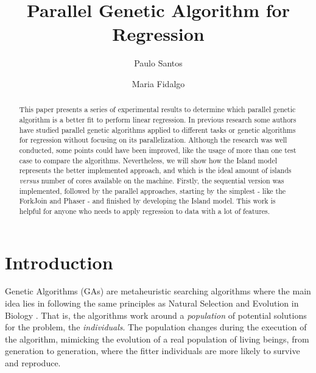 \documentclass[runningheads]{llncs}
\begin{document}
\title{Parallel Genetic Algorithm for Regression}

\author{Paulo Santos \and
Maria Fidalgo
}


\maketitle

\begin{abstract}
This paper presents a series of experimental results to determine which parallel genetic algorithm is a better fit to perform linear regression. In previous research some authors have studied parallel genetic algorithms applied to different tasks or genetic algorithms for regression without focusing on its parallelization. Although the research was well conducted, some points could have been improved, like the usage of more than one test case to compare the algorithms. Nevertheless, we will show how the Island model represents the better implemented approach, and which is the ideal amount of islands \textit{versus} number of cores available on the machine. Firstly, the sequential version was implemented, followed by the parallel approaches, starting by the simplest - like the ForkJoin and Phaser - and finished by developing the Island model. This work is helpful for anyone who needs to apply regression to data with a lot of features.

\end{abstract}


\section{Introduction}

Genetic Algorithms (GAs) are metaheuristic searching algorithms where the main idea lies in following the same principles as Natural Selection and Evolution in Biology \cite{sivanandam2008genetic}. That is, the algorithms work around a \textit{population} of potential solutions for the problem, the \textit{individuals}. The population changes during the execution of the algorithm, mimicking the evolution of a real population of living beings, from generation to generation, where the fitter individuals are more likely to survive and reproduce.
\end{document}
